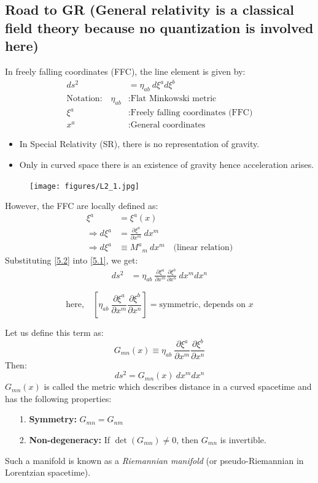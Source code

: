 \documentclass[14pt]{article} %
\begin{document}
\subsection{Road to GR (General relativity is a classical field theory because no quantization is involved here)}
In freely falling coordinates (FFC), the line element is given by:
\begin{align*}
    ds^2 &= \eta_{ab}~d\xi^a d\xi^b \tag{5.1} \label{5.1} \\
    \text{Notation:} \quad 
    \eta_{ab} &: \text{Flat Minkowski metric} \\
    \xi^a &: \text{Freely falling coordinates (FFC)} \\
    x^a &: \text{General coordinates}
\end{align*}
\begin{tcolorbox}[ title=\textbf{Note:}]
\begin{itemize}
    \item In Special Relativity (SR), there is no representation of gravity.
    \item Only in curved space there is an existence of gravity hence acceleration arises.
\end{itemize}
\end{tcolorbox}
\begin{figure}[H]
\centering
\texttt{[image: figures/L2\_1.jpg]}
\caption*{}
\vspace{-1em}
\end{figure}
However, the FFC are locally defined as:
\begin{align*}
    \xi^a &= \xi^a(x) \\
    \Rightarrow d\xi^a &= \frac{\partial \xi^a}{\partial x^m}~ dx^m \tag{5.2} \label{5.2} \\
    \Rightarrow d\xi^a &\equiv M^a{}_m~dx^m \quad \text{(linear relation)}
\end{align*}
Substituting \eqref{5.2} into \eqref{5.1}, we get:
\begin{align*}
    ds^2 &= \eta_{ab}~\frac{\partial \xi^a}{\partial x^m} \frac{\partial \xi^b}{\partial x^n}~dx^m dx^n \tag{5.3} \label{5.3}
\end{align*}

\[\text{here,}\quad
\left[ \eta_{ab}~ \frac{\partial \xi^a}{\partial x^m} \frac{\partial \xi^b}{\partial x^n} \right] = \text{symmetric, depends on } x
\]

Let us define this term as:
\[
G_{mn}(x) \equiv \eta_{ab}~ \frac{\partial \xi^a}{\partial x^m} \frac{\partial \xi^b}{\partial x^n}
\]
Then:
\[
ds^2 = G_{mn}(x)~dx^m dx^n
\]
$G_{mn}(x)$ is called the metric which describes distance in a curved spacetime and has the following properties:
\begin{itemize}
    \item[1.] \textbf{Symmetry:} $G_{mn} = G_{nm}$
    \item[2.] \textbf{Non-degeneracy:} If $\det(G_{mn}) \neq 0$, then $G_{mn}$ is invertible.
\end{itemize}
Such a manifold is known as a \textit{Riemannian manifold} (or pseudo-Riemannian in Lorentzian spacetime).
\end{document}
